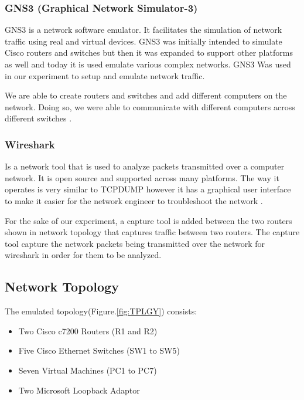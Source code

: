 \documentclass{article}
\begin{document}
\subsubsection{GNS3 (Graphical Network Simulator-3)}
GNS3 is a network software emulator. It facilitates the simulation of network traffic using real and virtual devices. GNS3 was initially intended to simulate Cisco routers and switches but then it was expanded to support other platforms as well and today it is used emulate various complex networks.  GNS3 Was used in our experiment to setup and emulate network traffic. 


We are able to create routers and switches and add different computers on the network. Doing so, we were able to communicate with different computers across different switches \cite{hassine2014toward}.


\subsubsection{Wireshark}
Is a network tool that is used to analyze packets transmitted over a computer network. It is open source and supported across many platforms. The way it operates is very similar to TCPDUMP however it has a graphical user interface to make it easier for the network engineer to troubleshoot the network \cite{orebaugh2006wireshark}.


For the sake of our experiment, a capture tool is added between the two routers shown in network topology that captures traffic between two routers. The capture tool capture the network packets being transmitted over the network for wireshark in order for them to be analyzed.

\subsection{Network Topology}

The emulated topology(Figure.\ref{fig:TPLGY}) consists:

\begin{itemize}
	
	\item Two Cisco c7200 Routers (R1 and R2)
	\item Five Cisco Ethernet Switches (SW1 to SW5)
	\item Seven Virtual Machines (PC1 to PC7)
	\item Two Microsoft Loopback Adaptor 
\end{itemize}
\end{document}
